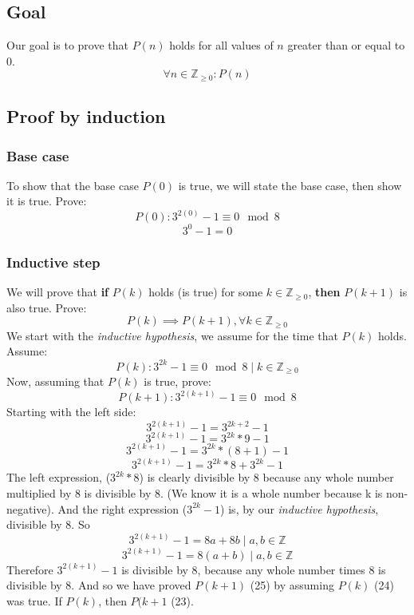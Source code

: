 \documentclass{article}
\begin{document}
\subsection{Goal}
Our goal is to prove that $P(n)$ holds for all values of $n$ greater than or equal to 0.
\begin{equation}
\forall n \in \mathbb Z_{\ge 0} : P(n)
\end{equation}

\subsection{Proof by induction}
\subsubsection{Base case}
To show that the base case $P(0)$ is true, we will state the base case, then show it is true. Prove:
\begin{equation}
P(0): 3^{2(0)} - 1 \equiv 0 \mod 8
\end{equation}
\[ 3^0 - 1 = 0 \]

\subsubsection{Inductive step}
We will prove that \textbf{if} $P(k)$ holds (is true) for some $k \in \mathbb Z_{\ge 0}$, \textbf{then} $P(k + 1)$ is also true. Prove:
\begin{equation}
P(k) \implies P(k + 1), \forall k \in \mathbb Z_{\ge 0}
\end{equation}
We start with the \textit{inductive hypothesis}, we assume for the time that $P(k)$ holds. Assume:
\begin{equation}
P(k): 3^{2k} - 1 \equiv 0 \mod 8 \mid k \in \mathbb Z_{\ge 0}
\end{equation}
Now, assuming that $P(k)$ is true, prove:
\begin{equation}
P(k + 1): 3^{2(k + 1)} - 1 \equiv 0 \mod 8
\end{equation}
Starting with the left side:
\[ 3^{2(k + 1)} - 1 = 3^{2k + 2} - 1 \]
\[ 3^{2(k + 1)} - 1 = 3^{2k} * 9 - 1 \]
\[ 3^{2(k + 1)} - 1 = 3^{2k} * (8 + 1) - 1 \]
\[ 3^{2(k + 1)} - 1 = 3^{2k} * 8 + 3^{2k} - 1 \]
The left expression, ($3^{2k} * 8$) is clearly divisible by 8 because any whole number multiplied by 8 is divisible by 8. (We know it is a whole number because k is non-negative). And the right expression ($3^{2k} - 1$) is, by our \textit{inductive hypothesis}, divisible by 8. So
\[ 3^{2(k + 1)} - 1 = 8a + 8b \mid a,b \in \mathbb Z\]
\[ 3^{2(k + 1)} - 1 = 8(a + b) \mid a,b \in \mathbb Z\]
Therefore $3^{2(k + 1)} - 1$ is divisible by 8, because any whole number times 8 is divisible by 8. And so we have proved $P(k + 1)$ (25) by assuming $P(k)$ (24) was true. If $P(k)$, then $P(k + 1$ (23).
\end{document}
